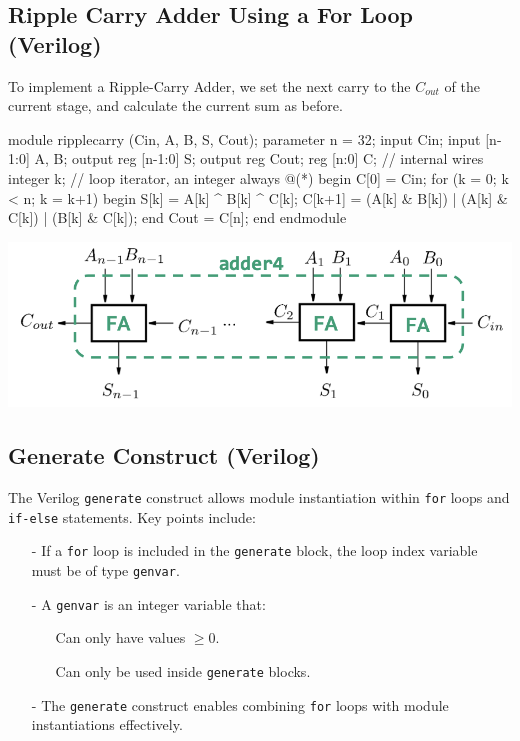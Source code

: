\documentclass[12pt,openany]{book}
\begin{document}
\subsection{Ripple Carry Adder Using a For Loop (Verilog)}
To implement a Ripple-Carry Adder, we set the next carry to the $C_{out}$ of the current stage, and calculate the current sum as before.
\newline
\vspace*{10px}
\begin{minipage}[htp]{0.45\textwidth}	
	\begin{vhdl}
module ripplecarry (Cin, A, B, S, Cout);
	parameter n = 32;
	input Cin;
	input [n-1:0] A, B;
	output reg [n-1:0] S;
	output reg Cout;
	reg [n:0] C; // internal wires
	integer k; // loop iterator, an integer
	always @(*) begin
		C[0] = Cin;
		for (k = 0; k < n; k = k+1) begin
		S[k] = A[k] ^ B[k] ^ C[k];
		C[k+1] = (A[k] & B[k]) | (A[k] & C[k]) | (B[k] & C[k]);
	end
	Cout = C[n];
	end
endmodule
	\end{vhdl}
\end{minipage}
\hfill
\vline
\hfill
\begin{minipage}[htp]{0.45\textwidth}
	\begin{center}
		\includegraphics[width=1.3\textwidth]{circuits/10.2.4_2.png}
	\end{center}	
\end{minipage}

\subsection{Generate Construct (Verilog)}
The Verilog \texttt{generate} construct allows module instantiation within \texttt{for} loops and \texttt{if-else} statements. Key points include:

\begin{itemize}
    \item[-] If a \texttt{for} loop is included in the \texttt{generate} block, the loop index variable must be of type \texttt{genvar}.
    \item[-] A \texttt{genvar} is an integer variable that:
    \begin{itemize}
        \item[] Can only have values $\geq 0$.
        \item[] Can only be used inside \texttt{generate} blocks.
    \end{itemize}
    \item[-] The \texttt{generate} construct enables combining \texttt{for} loops with module instantiations effectively.
\end{itemize}
\vfill
\end{document}
